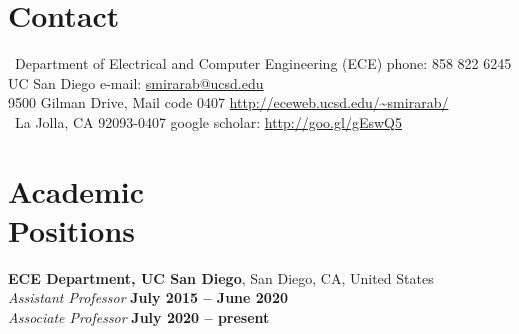 \documentclass[margin,line,letterpaper]{resume-small}
\begin{document}
\begin{resume}

\begin{small}
    \section{\mysidestyle Contact}
    ~Department of Electrical and Computer Engineering (ECE)				\hfill phone: 858 822 6245   \vspace{0mm}\\\vspace{0mm} 
    \vspace{0mm} UC San Diego   \hfill  e-mail: \url{smirarab@ucsd.edu}   \vspace{0mm}\\\vspace{0mm}
   9500 Gilman Drive, Mail code 0407  \hfill  \url{http://eceweb.ucsd.edu/~smirarab/}\vspace{0mm}\\\vspace{-4.5mm}%
   ~La Jolla, CA 92093-0407   	\hfill google scholar: \url{http://goo.gl/gEswQ5} \vspace{0mm}\\\vspace{-4.5mm}
   
      
    \section{\mysidestyle Academic\\Positions}

    \textbf{ECE Department, UC San Diego}, San Diego, CA, United States\\
    \textsl{Assistant Professor} \hfill \textbf{ July 2015 -- June 2020}\vspace{0mm}\\\vspace{0mm}%
        \textsl{Associate Professor} \hfill \textbf{ July 2020 -- present}\vspace{-3mm}\\\vspace{-5mm}%

\end{small}
\end{resume}
\end{document}

